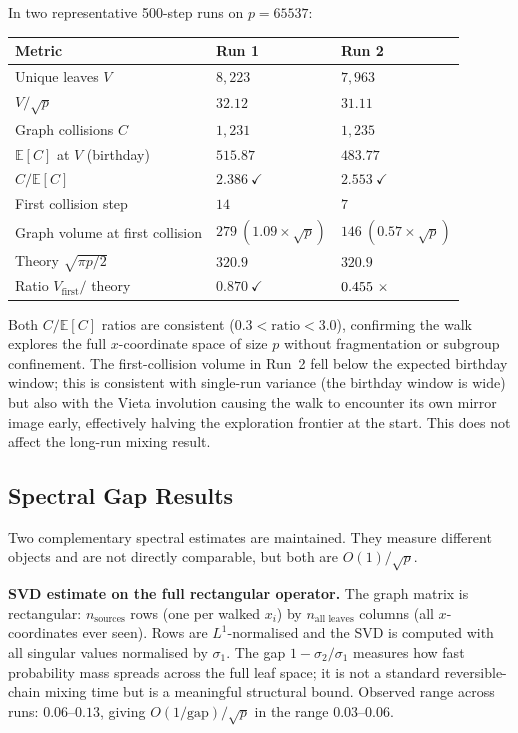 \documentclass[11pt]{article}
\theoremstyle{definition}
\theoremstyle{remark}
\newcommand{\BigO}[1]{O\!\left(#1\right)}
\begin{document}
In two representative 500-step runs on $p = 65537$:

\begin{center}
\begin{tabular}{lll}
  \toprule
  Metric & Run 1 & Run 2 \\
  \midrule
  Unique leaves $V$ & $8{,}223$ & $7{,}963$ \\
  $V / \sqrt{p}$ & $32.12$ & $31.11$ \\
  Graph collisions $C$ & $1{,}231$ & $1{,}235$ \\
  $\mathbb{E}[C]$ at $V$ (birthday) & $515.87$ & $483.77$ \\
  $C / \mathbb{E}[C]$ & $2.386\ \checkmark$ & $2.553\ \checkmark$ \\
  First collision step & $14$ & $7$ \\
  Graph volume at first collision & $279\ (1.09 \times \sqrt{p})$ & $146\ (0.57 \times \sqrt{p})$ \\
  Theory $\sqrt{\pi p / 2}$ & $320.9$ & $320.9$ \\
  Ratio $V_\text{first} /$ theory & $0.870\ \checkmark$ & $0.455\ \text{\texttimes}$ \\
  \bottomrule
\end{tabular}
\end{center}

Both $C/\mathbb{E}[C]$ ratios are consistent ($0.3 < \text{ratio} < 3.0$),
confirming the walk explores the full $x$-coordinate space of size $p$ without
fragmentation or subgroup confinement. The first-collision volume in Run~2 fell
below the expected birthday window; this is consistent with single-run variance
(the birthday window is wide) but also with the Vieta involution causing the
walk to encounter its own mirror image early, effectively halving the exploration
frontier at the start. This does not affect the long-run mixing result.

\subsection{Spectral Gap Results}
\label{sec:spectral}

Two complementary spectral estimates are maintained. They measure different
objects and are not directly comparable, but both are $\BigO{1}/\sqrt{p}$.

\medskip
\noindent\textbf{SVD estimate on the full rectangular operator.} The graph
matrix is rectangular: $n_\text{sources}$ rows (one per walked $x_i$) by
$n_\text{all leaves}$ columns (all $x$-coordinates ever seen). Rows are
$L^1$-normalised and the SVD is computed with all singular values normalised by
$\sigma_1$. The gap $1 - \sigma_2/\sigma_1$ measures how fast probability mass
spreads across the full leaf space; it is not a standard reversible-chain mixing
time but is a meaningful structural bound. Observed range across runs:
$0.06$--$0.13$, giving $\BigO{1/\mathrm{gap}}/\sqrt{p}$ in the range
$0.03$--$0.06$.
\end{document}
